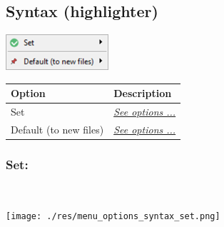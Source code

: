 \hypertarget{menu_options_syntax}{}
\subsection{Syntax (highlighter)}

\includegraphics[scale=0.8]{./res/menu_options_syntax.png}\\

\begin{scriptsize}
  \begin{tabularx}{\textwidth}{>{\hsize=0.3\hsize}X>{\hsize=0.7\hsize}X}\\
    \hline
    \textbf{Option} & \textbf{Description} \\
    \hline
    Set & \textit{\href{\#menu\_options\_syntax\_set}{See options ...}} \\
    \hdashline[1pt/1pt]
    Default (to new files) & \textit{\href{\#menu\_options\_syntax\_default}{See options ...}} \\
    \hline
  \end{tabularx}
\end{scriptsize}


\newpage
\hypertarget{menu_options_syntax_set}{}
\subsubsection{Set:}\\

\texttt{[image: ./res/menu\_options\_syntax\_set.png]}\\

